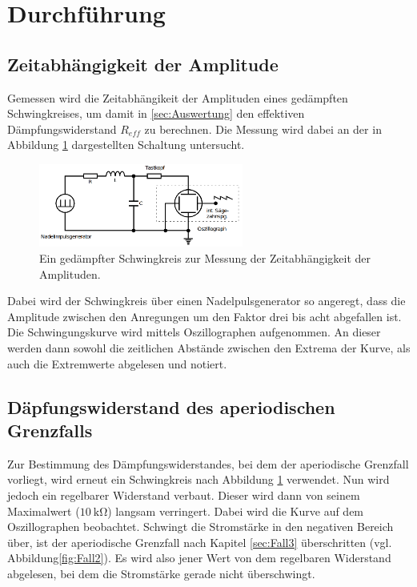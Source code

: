 \section{Durchführung}
\label{sec:Durchführung}
\subsection{Zeitabhängigkeit der Amplitude}
\label{sec:a}
Gemessen wird die Zeitabhängikeit der Amplituden eines gedämpften Schwingkreises, um damit in \ref{sec:Auswertung} den effektiven Dämpfungswiderstand
$R_{eff}$ zu berechnen. Die Messung wird dabei an der in Abbildung \ref{fig:a} dargestellten Schaltung untersucht. 
\begin{figure}[H]
    \centering
    \includegraphics[width=0.6\textwidth]{pictures/Aufbau_a.png}
    \caption{Ein gedämpfter Schwingkreis zur Messung der Zeitabhängigkeit der Amplituden.\cite{AP01}}
    \label{fig:a}
\end{figure}
Dabei wird der Schwingkreis über einen Nadelpulsgenerator so angeregt, dass die Amplitude zwischen den Anregungen um den Faktor drei bis acht 
abgefallen ist. Die Schwingungskurve wird mittels Oszillographen aufgenommen. An dieser werden dann sowohl die zeitlichen Abstände zwischen den Extrema 
der Kurve, als auch die Extremwerte abgelesen und notiert. 
\subsection{Däpfungswiderstand des aperiodischen Grenzfalls}
\label{sec:b}
Zur Bestimmung des Dämpfungswiderstandes, bei dem der aperiodische Grenzfall vorliegt, wird erneut ein Schwingkreis nach Abbildung \ref{fig:a}
verwendet. Nun wird jedoch ein regelbarer Widerstand verbaut. Dieser wird dann von seinem Maximalwert ($\SI{10}{\kilo\ohm}$) langsam verringert. 
Dabei wird die Kurve auf dem Oszillographen beobachtet. Schwingt die Stromstärke in den negativen Bereich über, ist der aperiodische Grenzfall 
nach Kapitel \ref{sec:Fall3} überschritten (vgl. Abbildung\ref{fig:Fall2}). Es wird also jener Wert von dem regelbaren Widerstand abgelesen, bei 
dem die Stromstärke gerade nicht überschwingt. 

